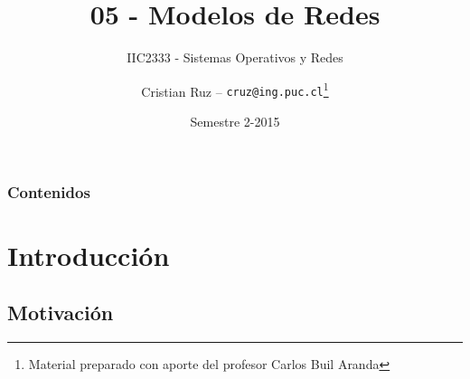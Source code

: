\documentclass[letter]{beamer}
\title[IIC2333] %
{05 - Modelos de Redes}
\subtitle{IIC2333 - Sistemas Operativos y Redes}
\author[C.Ruz] %
{Cristian Ruz -- {\tt cruz@ing.puc.cl}\footnote{Material preparado con aporte del profesor Carlos Buil Aranda} }
\institute[PUC] %
{
  Departamento de Ciencia de la Computación\\
  Pontificia Universidad Católica de Chile
}
\date[2/2015] %
{Semestre 2-2015}
\begin{document}
\frame{\titlepage}

\begin{frame}
\frametitle{Contenidos}
\tableofcontents
\end{frame}


\section{Introducción}

\subsection{Motivación}
\end{document}
